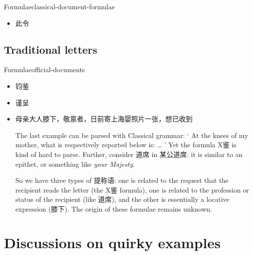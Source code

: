 \documentclass[UTF8, a4paper, oneside, scheme=plain, 12pt]{ctexrep}
\newcommand{\form}[1]{\emph{#1}}
\newcommand{\translate}[1]{`#1'}
\begin{document}
\begin{todobox}{Formulae}{classical-document-formulae}
    \begin{itemize}
        \item 此令
    \end{itemize}
\end{todobox}

\section{Traditional letters}

\begin{todobox}{Formulae}{official-documents}
    \begin{itemize}
        \item 钧鉴
        \item 谨呈
        \item 母亲大人膝下，敬禀者，日前寄上海婴照片一张，想已收到
            
        The last example can be parsed with Classical grammar:
        \translate{
            At the knees of my mother, what is respectively reported below is: \dots
        }
        Yet the formula X鉴 is kind of hard to parse.
        Further, consider 道席 in 某公道席:
        it is similar to an epithet, or something like \form{your Majesty}.

        So we have three types of 提称语: one is related to the request that the recipient reads the letter (the X鉴 formula), one is related to the profession or status of the recipient (like 道席), and the other is essentially a locative expression (膝下).
        The origin of these formulae remains unknown.
    \end{itemize}
\end{todobox}

\chapter{Discussions on quirky examples}
\end{document}
